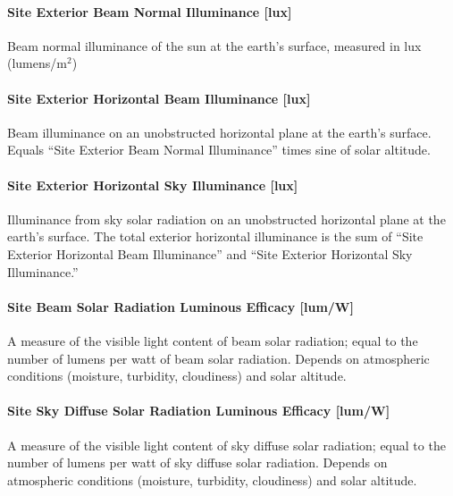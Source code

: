 \paragraph{Site Exterior Beam Normal Illuminance {[}lux{]}}\label{site-exterior-beam-normal-illuminance-lux}

Beam normal illuminance of the sun at the earth's surface, measured in lux (lumens/m\(^{2}\))

\paragraph{Site Exterior Horizontal Beam Illuminance {[}lux{]}}\label{site-exterior-horizontal-beam-illuminance-lux}

Beam illuminance on an unobstructed horizontal plane at the earth's surface. Equals ``Site Exterior Beam Normal Illuminance'' times sine of solar altitude.

\paragraph{Site Exterior Horizontal Sky Illuminance {[}lux{]}}\label{site-exterior-horizontal-sky-illuminance-lux}

Illuminance from sky solar radiation on an unobstructed horizontal plane at the earth's surface. The total exterior horizontal illuminance is the sum of ``Site Exterior Horizontal Beam Illuminance'' and ``Site Exterior Horizontal Sky Illuminance.''

\paragraph{Site Beam Solar Radiation Luminous Efficacy {[}lum/W{]}}\label{site-beam-solar-radiation-luminous-efficacy-lumw}

A measure of the visible light content of beam solar radiation; equal to the number of lumens per watt of beam solar radiation. Depends on atmospheric conditions (moisture, turbidity, cloudiness) and solar altitude.

\paragraph{Site Sky Diffuse Solar Radiation Luminous Efficacy {[}lum/W{]}}\label{site-sky-diffuse-solar-radiation-luminous-efficacy-lumw}

A measure of the visible light content of sky diffuse solar radiation; equal to the number of lumens per watt of sky diffuse solar radiation. Depends on atmospheric conditions (moisture, turbidity, cloudiness) and solar altitude.

